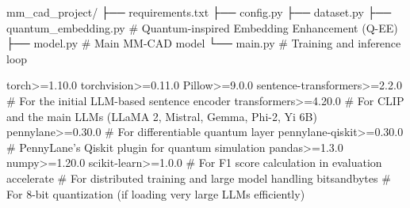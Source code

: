mm_cad_project/
├── requirements.txt
├── config.py
├── dataset.py
├── quantum_embedding.py  # Quantum-inspired Embedding Enhancement (Q-EE)
├── model.py              # Main MM-CAD model
└── main.py               # Training and inference loop


torch>=1.10.0
torchvision>=0.11.0
Pillow>=9.0.0
sentence-transformers>=2.2.0 # For the initial LLM-based sentence encoder
transformers>=4.20.0       # For CLIP and the main LLMs (LLaMA 2, Mistral, Gemma, Phi-2, Yi 6B)
pennylane>=0.30.0          # For differentiable quantum layer
pennylane-qiskit>=0.30.0   # PennyLane's Qiskit plugin for quantum simulation
pandas>=1.3.0
numpy>=1.20.0
scikit-learn>=1.0.0        # For F1 score calculation in evaluation
accelerate                 # For distributed training and large model handling
bitsandbytes               # For 8-bit quantization (if loading very large LLMs efficiently)
